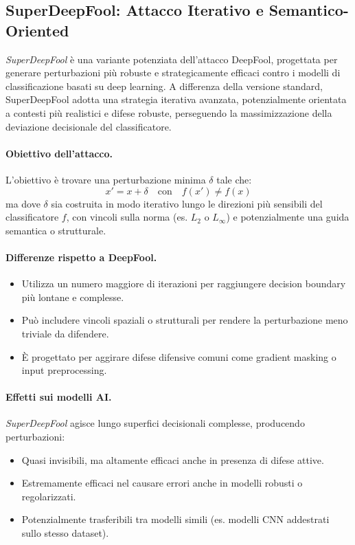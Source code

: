 \subsection{SuperDeepFool: Attacco Iterativo e Semantico-Oriented}
\label{sec:superdeepfool}

\textit{SuperDeepFool} è una variante potenziata dell’attacco DeepFool, progettata per generare perturbazioni più robuste e strategicamente efficaci contro i modelli di classificazione basati su deep learning. A differenza della versione standard, SuperDeepFool adotta una strategia iterativa avanzata, potenzialmente orientata a contesti più realistici e difese robuste, perseguendo la massimizzazione della deviazione decisionale del classificatore.

\paragraph{Obiettivo dell’attacco.}
L’obiettivo è trovare una perturbazione minima $\delta$ tale che:
\[
x' = x + \delta \quad \text{con} \quad f(x') \neq f(x)
\]
ma dove $\delta$ sia costruita in modo iterativo lungo le direzioni più sensibili del classificatore $f$, con vincoli sulla norma (es. $L_2$ o $L_\infty$) e potenzialmente una guida semantica o strutturale.

\paragraph{Differenze rispetto a DeepFool.}
\begin{itemize}
    \item Utilizza un numero maggiore di iterazioni per raggiungere decision boundary più lontane e complesse.
    \item Può includere vincoli spaziali o strutturali per rendere la perturbazione meno triviale da difendere.
    \item È progettato per aggirare difese difensive comuni come gradient masking o input preprocessing.
\end{itemize}

\paragraph{Effetti sui modelli AI.}
\textit{SuperDeepFool} agisce lungo superfici decisionali complesse, producendo perturbazioni:
\begin{itemize}
    \item Quasi invisibili, ma altamente efficaci anche in presenza di difese attive.
    \item Estremamente efficaci nel causare errori anche in modelli robusti o regolarizzati.
    \item Potenzialmente trasferibili tra modelli simili (es. modelli CNN addestrati sullo stesso dataset).
\end{itemize}

